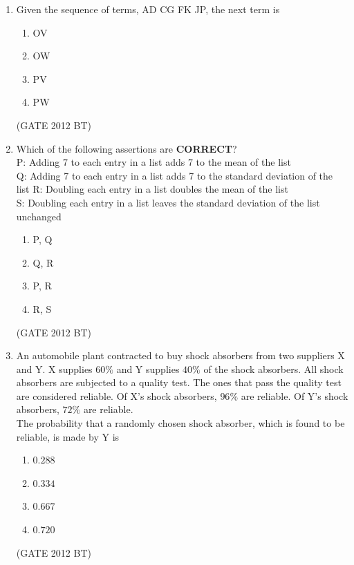 \documentclass[journal,12pt,onecolumn]{IEEEtran}
\theoremstyle{remark}
\begin{document}
\begin{enumerate}
\item Given the sequence of terms, AD CG FK JP, the next term is
\begin{multicols}{2}
\begin{enumerate}
\item OV	
\item OW	
\item  PV	
\item  PW
\end{enumerate}
\end{multicols} \hfill(GATE 2012 BT)

 
\item Which of the following assertions are \textbf{CORRECT}?\\
P: Adding 7 to each entry in a list adds 7 to the mean of the list\\
Q: Adding 7 to each entry in a list adds 7 to the standard deviation of the list R: Doubling each entry in a list doubles the mean of the list\\
S: Doubling each entry in a list leaves the standard deviation of the list unchanged
\begin{multicols}{4}
\begin{enumerate}
\item P, Q	
\item  Q, R	
\item  P, R	
\item  R, S
\end{enumerate}
\end{multicols} \hfill(GATE 2012 BT)


\item 	An automobile plant contracted to buy shock absorbers from two suppliers X and Y. X supplies $60\%$ and Y supplies $40\%$ of the shock absorbers. All shock absorbers are subjected to a quality test. The ones that pass the quality test are considered reliable. Of X’s shock absorbers, $96\%$ are reliable. Of Y’s shock absorbers, $72\%$ are reliable.\\

The probability that a randomly chosen shock absorber, which is found to be reliable, is made by Y is
\begin{multicols}{4}
\begin{enumerate}
\item $0.288$	
\item $0.334$
\item $0.667$	
\item $0.720$
\end{enumerate}
\end{multicols} \hfill(GATE 2012 BT)



\end{enumerate}
\end{document}
